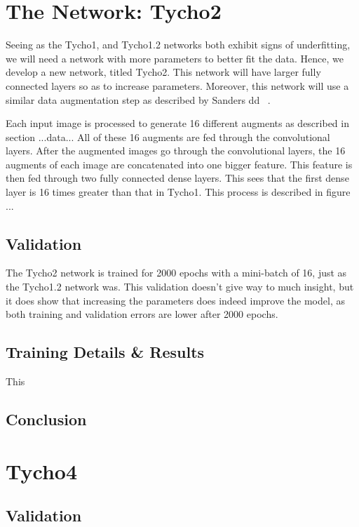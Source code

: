 \documentclass[12pt,a4paper,oneside,oldfontcommands]{memoir}
\begin{document}
\chapter{The Network: Tycho2}

Seeing as the Tycho1, and Tycho1.2 networks both exhibit signs of underfitting, we will need a network with more parameters to better fit the data. Hence, we develop a new network, titled Tycho2. This network will have larger fully connected layers so as to increase parameters. Moreover, this network will use a similar data augmentation step as described by Sanders dd ~\cite{Sanders-GZ}.

Each input image is processed to generate 16 different augments as described in section ...data... All of these 16 augments are fed through the convolutional layers. After the augmented images go through the convolutional layers, the 16 augments of each image are concatenated into one bigger feature. This feature is then fed through two fully connected dense layers. This sees that the first dense layer is 16 times greater than that in Tycho1. This process is described in figure ...

\section{Validation}

The Tycho2 network is trained for 2000 epochs with a mini-batch of 16, just as the Tycho1.2 network was. This validation doesn't give way to much insight, but it does show that increasing the parameters does indeed improve the model, as both training and validation errors are lower after 2000 epochs.


\section{Training Details & Results}

	This 

\section{Conclusion}

\chapter{Tycho4}


\section{Validation}
\end{document}
